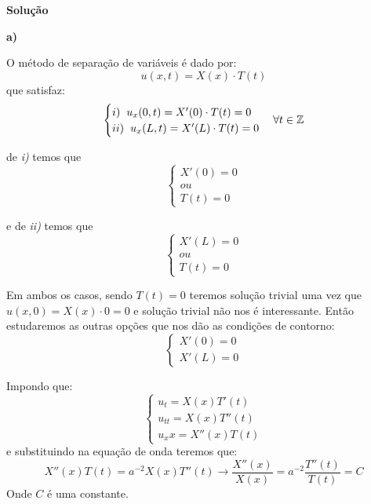 \linespread{1.5}

\textbf{Solução}

\textbf{a)} 

O método de separação de variáveis é dado por:
\begin{equation*}
    u(x,t) = X(x)\cdot T(t)
\end{equation*}
que satisfaz:
\begin{equation*}
    \begin{cases}
        i)\hspace{0.2cm} u_x (0, t) = X'(0)\cdot T(t) = 0\\
        ii)\hspace{0.2cm} u_x (L, t) = X'(L)\cdot T(t) = 0
    \end{cases} \forall t \in \mathbb{Z}
\end{equation*}

de \textit{i)} temos que \begin{equation*}
    \begin{cases}
        X'(0) = 0\\
            ou\\
        T(t) = 0
    \end{cases}
\end{equation*}

e de \textit{ii)} temos que \begin{equation*}
    \begin{cases}
        X'(L) = 0\\
            ou\\
        T(t) = 0
    \end{cases}
\end{equation*}

Em ambos os casos, sendo $T(t) =0 $ teremos solução trivial uma vez que $u(x,0) = X(x)\cdot 0 = 0$ e solução trivial não nos é interessante. Então estudaremos as outras opções que nos dão as condições de contorno:
\begin{equation*}
    \begin{cases}
         X'(0) = 0\\
         X'(L) = 0
    \end{cases}
\end{equation*}

Impondo que:
\begin{equation*}
    \begin{cases}
         u_t = X(x)T'(t)\\
         u_{tt} = X(x)T''(t)\\
         u_xx = X''(x)T(t) 
    \end{cases}
\end{equation*}
e substituindo na equação de onda teremos que:
\begin{equation*}
     X''(x)T(t) = a^{-2}X(x)T''(t) \longrightarrow \frac{X''(x)}{X(x)} = a^{-2}\frac{T''(t)}{T(t)} = C
\end{equation*}
Onde $C$ é uma constante.

